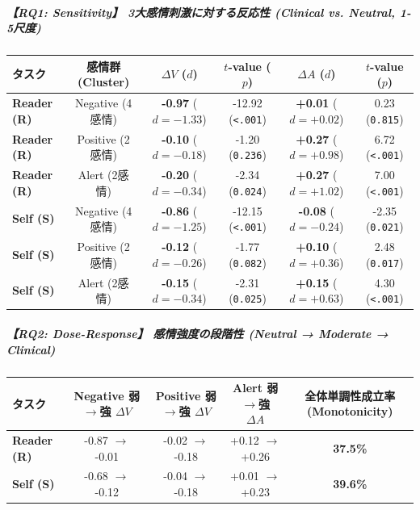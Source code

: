 \subparagraph{【RQ1: Sensitivity】 3大感情刺激に対する反応性 (Clinical vs. Neutral, 1-5尺度)}
\begin{center}
\small
\begin{tabular}{lccccc}
\toprule
\textbf{タスク} & \textbf{感情群 (Cluster)} & \textbf{$\Delta V$ ($d$)} & \textbf{$t$-value ($p$)} & \textbf{$\Delta A$ ($d$)} & \textbf{$t$-value ($p$)} \\
\midrule
\textbf{Reader (R)} & Negative (4感情) & \textbf{-0.97} ($d=-1.33$) & -12.92 (\texttt{<.001}) & \textbf{+0.01} ($d=+0.02$) & 0.23 (\texttt{0.815}) \\
\textbf{Reader (R)} & Positive (2感情) & \textbf{-0.10} ($d=-0.18$) & -1.20 (\texttt{0.236}) & \textbf{+0.27} ($d=+0.98$) & 6.72 (\texttt{<.001}) \\
\textbf{Reader (R)} & Alert (2感情) & \textbf{-0.20} ($d=-0.34$) & -2.34 (\texttt{0.024}) & \textbf{+0.27} ($d=+1.02$) & 7.00 (\texttt{<.001}) \\
\textbf{Self (S)} & Negative (4感情) & \textbf{-0.86} ($d=-1.25$) & -12.15 (\texttt{<.001}) & \textbf{-0.08} ($d=-0.24$) & -2.35 (\texttt{0.021}) \\
\textbf{Self (S)} & Positive (2感情) & \textbf{-0.12} ($d=-0.26$) & -1.77 (\texttt{0.082}) & \textbf{+0.10} ($d=+0.36$) & 2.48 (\texttt{0.017}) \\
\textbf{Self (S)} & Alert (2感情) & \textbf{-0.15} ($d=-0.34$) & -2.31 (\texttt{0.025}) & \textbf{+0.15} ($d=+0.63$) & 4.30 (\texttt{<.001}) \\
\bottomrule
\end{tabular}
\end{center}


\subparagraph{【RQ2: Dose-Response】 感情強度の段階性 (Neutral → Moderate → Clinical)}
\begin{center}
\small
\begin{tabular}{lcccc}
\toprule
\textbf{タスク} & \textbf{Negative 弱$\rightarrow$強 $\Delta V$} & \textbf{Positive 弱$\rightarrow$強 $\Delta V$} & \textbf{Alert 弱$\rightarrow$強 $\Delta A$} & \textbf{全体単調性成立率 (Monotonicity)} \\
\midrule
\textbf{Reader (R)} & -0.87 $\rightarrow$ -0.01 & -0.02 $\rightarrow$ -0.18 & +0.12 $\rightarrow$ +0.26 & \textbf{37.5\%} \\
\textbf{Self (S)} & -0.68 $\rightarrow$ -0.12 & -0.04 $\rightarrow$ -0.18 & +0.01 $\rightarrow$ +0.23 & \textbf{39.6\%} \\
\bottomrule
\end{tabular}
\end{center}


